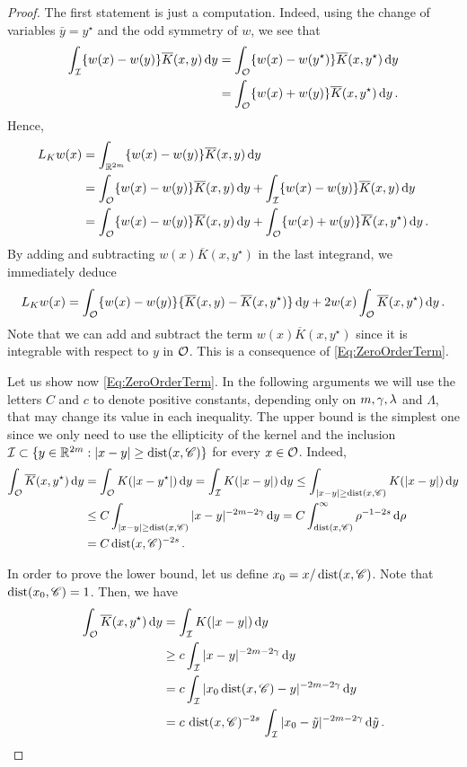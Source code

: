 \begin{proof}
	The first statement is just a computation. Indeed,  using the change of variables  $\bar{y} = y^\star$ and the odd symmetry of $w$, we see that
	\begin{align*}
	\int_{\mathcal{I}}  \{w(x) - w(y) \} \overline{K}(x, y)\,\mathrm{d} y &= \int_{\mathcal{O}} \{w(x) - w(y^\star) \}\overline{K}(x, y^\star)\,\mathrm{d} y \\
	&= \int_{\mathcal{O}} \{w(x) + w(y) \}\overline{K}(x, y^\star)\,\mathrm{d} y\,.
	\end{align*}
	Hence,
	\begin{align*}
	L_K w (x) &= \int_{\mathbb{R}^{2m}}  \{w(x) - w(y) \} \overline{K}(x, y)\,\mathrm{d} y \\
	&= \int_{\mathcal{O}}  \{w(x) - w(y) \} \overline{K}(x, y)\,\mathrm{d} y +\int_{\mathcal{I}}  \{w(x) - w(y) \} \overline{K}(x, y)\,\mathrm{d} y \\
	&= \int_{\mathcal{O}} \{w(x) - w(y) \} \overline{K}(x, y) \,\mathrm{d} y +  \int_{\mathcal{O}} \{w(x) + w(y) \} \overline{K}(x, y^\star) \,\mathrm{d} y \,.
	\end{align*}
	By adding and subtracting $w(x)\overline{K}(x, y^\star)$ in the last integrand, we immediately deduce
	$$
	L_K w (x) =  \int_{\mathcal{O}} \{w(x) - w(y) \} \{\overline{K}(x, y) - \overline{K}(x, y^\star)  \} \,\mathrm{d} y +  2 w(x) \int_{\mathcal{O}} \overline{K}(x, y^\star) \,\mathrm{d} y\,.
	$$
	Note that we can add and subtract the term $w(x)\overline{K}(x, y^\star)$  since it is integrable with respect to $y$ in $\mathcal{O}$. This is a consequence of \eqref{Eq:ZeroOrderTerm}.
	
	Let us show now \eqref{Eq:ZeroOrderTerm}. In the following arguments we will use the letters $C$ and $c$ to denote positive constants, depending only on $m, \gamma, \lambda$ and $\Lambda$, that may change its value in each inequality. The upper bound is the simplest one since we only need to use the ellipticity of the kernel and the inclusion $\mathcal{I} \subset \{y\in\mathbb{R}^{2m}:|x-y|\geq \operatorname{dist}(x,\mathscr{C})\}$ for every $x\in \mathcal{O}$. Indeed,
	\begin{align*}
	\int_{\mathcal{O}} \overline{K}(x, y^\star) \,\mathrm{d} y &=  \int_{\mathcal{O}} K(|x-y^\star|) \,\mathrm{d} y = \int_{\mathcal{I}} K(|x-y|) \,\mathrm{d} y \leq \int_{|x-y|\geq \operatorname{dist}(x,\mathscr{C})} K(|x-y|) \,\mathrm{d} y \\
	&\leq C \int_{|x-y|\geq \operatorname{dist}(x,\mathscr{C})} |x-y|^{-2m-2\gamma} \,\mathrm{d} y = C \int_{\operatorname{dist}(x,\mathscr{C})}^\infty \rho^{-1-2s} \,\mathrm{d} \rho \\
	&= C \operatorname{dist}(x,\mathscr{C})^{-2s}\,.
	\end{align*}

	In order to prove the lower bound, let us define $x_0 = x/\operatorname{dist}(x,\mathscr{C})$. Note that $\operatorname{dist} (x_0, \mathscr{C}) = 1$. Then, we have
	\begin{align*}
	\int_{\mathcal{O}} \overline{K}(x, y^\star) \,\mathrm{d} y &=  \int_{\mathcal{I}} K(|x-y|) \,\mathrm{d} y \\
	&\geq c \int_{\mathcal{I}} |x-y|^{-2m-2\gamma} \,\mathrm{d} y \\
	&= c \int_{\mathcal{I}} |x_0\operatorname{dist}(x,\mathscr{C})-y|^{-2m-2\gamma} \,\mathrm{d} y \\
	&= c \,\operatorname{dist}(x,\mathscr{C})^{-2s}\, \int_{\mathcal{I}} |x_0-\tilde{y}|^{-2m-2\gamma} \,\mathrm{d} \tilde{y}\,.
	\end{align*}
	

\end{proof}
